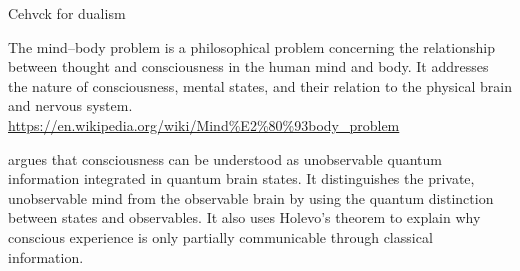 \documentclass[a4paper]{article}
\title{}
\date{}
\begin{document}
    \maketitle
    
    Cehvck for dualism
    
    The mind–body problem is a philosophical problem concerning the relationship between thought and consciousness in the human mind and body. It addresses the nature of consciousness, mental states, and their relation to the physical brain and nervous system.
    \url{https://en.wikipedia.org/wiki/Mind%E2%80%93body_problem}
    
    \cite{georgiev-2020-quantum-information-theoretic-approach-to-the-mind-brain-problem}  argues that consciousness can be understood as unobservable quantum information integrated in quantum brain states. It distinguishes the private, unobservable mind from the observable brain by using the quantum distinction between states and observables. It also uses Holevo’s theorem to explain why conscious experience is only partially communicable through classical information.
    
    
    
\end{document}
